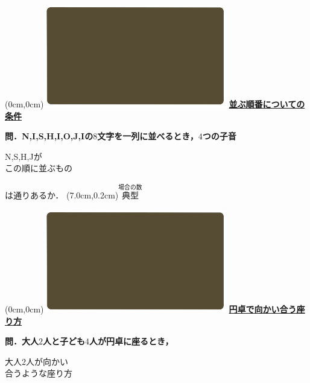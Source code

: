 \documentclass[10pt,
fleqn,
dvipdfmx,
uplatex
]{jsarticle}
\begin{document}
\at(0cm,0cm){\includegraphics[width=8cm,bb=0 0 1920 1080]{./youtube/thumbnails/templates/smart_background/場合の数.jpeg}}
{\color{orange}\bf\boldmath\LARGE\underline{並ぶ順番についての条件}}\vspace{0.3zw}

\normalsize 
\bf\boldmath 問．N,\;I,\;S,\;H,\;I,\;O,\;J,\;Iの$8$文字を一列に並べるとき，$4$つの子音

\huge
\vspace{-0.2zw}
\hspace{0.1zw} N,\;S,\;H,\;Jが\vspace{-0.2zw}\\
\hfill この順に並ぶもの\hspace{0.1zw} 

\normalsize
\hfill は通りあるか．
\at(7.0cm,0.2cm){\small\color{bradorange}$\overset{\text{場合の数}}{\text{典型}}$}


\newpage



\at(0cm,0cm){\includegraphics[width=8cm,bb=0 0 1920 1080]{./youtube/thumbnails/templates/smart_background/場合の数.jpeg}}
{\color{orange}\bf\boldmath\LARGE\underline{円卓で向かい合う座り方}}\vspace{0.3zw}

\normalsize 
\bf\boldmath 問．大人$2$人と子ども$4$人が円卓に座るとき，

\Huge
\vspace{-0.2zw}
\hspace{0.05zw} 大人$2$人が向かい\vspace{-0.2zw}\\
\hfill 合うような座り方\hspace{0.1zw} 
\vspace{0.1zw}
\end{document}
